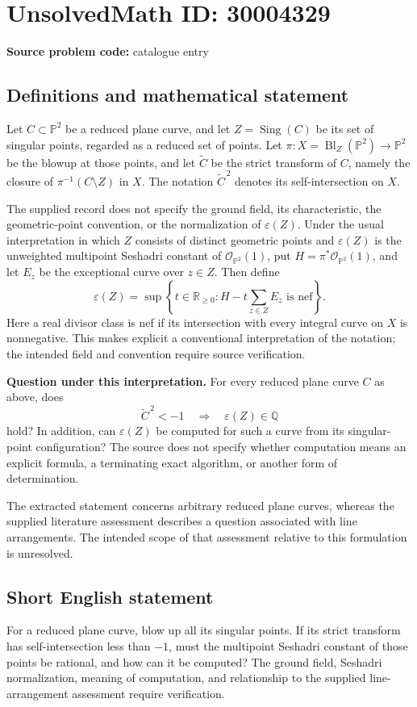 \documentclass[11pt]{article}
\newcommand{\Q}{\mathbb{Q}}
\newcommand{\R}{\mathbb{R}}
\newcommand{\PP}{\mathbb{P}}
\begin{document}
\section*{UnsolvedMath ID: 30004329}
\textbf{Source problem code:} catalogue entry
\subsection{Definitions and mathematical statement}
Let \(C\subset\PP^2\) be a reduced plane curve, and let \(Z=\operatorname{Sing}(C)\) be its set of singular points, regarded as a reduced set of points. Let \(\pi:X=\operatorname{Bl}_Z(\PP^2)\to\PP^2\) be the blowup at those points, and let \(\widetilde C\) be the strict transform of \(C\), namely the closure of \(\pi^{-1}(C\setminus Z)\) in \(X\). The notation \(\widetilde C^{\,2}\) denotes its self-intersection on \(X\).

The supplied record does not specify the ground field, its characteristic, the geometric-point convention, or the normalization of \(\varepsilon(Z)\). Under the usual interpretation in which \(Z\) consists of distinct geometric points and \(\varepsilon(Z)\) is the unweighted multipoint Seshadri constant of \(\mathcal O_{\PP^2}(1)\), put \(H=\pi^*\mathcal O_{\PP^2}(1)\), and let \(E_z\) be the exceptional curve over \(z\in Z\). Then define
\[
\varepsilon(Z)=\sup\left\{t\in\R_{\geq0}:H-t\sum_{z\in Z}E_z\text{ is nef}\right\}.
\]
Here a real divisor class is nef if its intersection with every integral curve on \(X\) is nonnegative. This makes explicit a conventional interpretation of the notation; the intended field and convention require source verification.

\textbf{Question under this interpretation.} For every reduced plane curve \(C\) as above, does
\[
\widetilde C^{\,2}<-1
\quad\Longrightarrow\quad
\varepsilon(Z)\in\Q
\]
hold? In addition, can \(\varepsilon(Z)\) be computed for such a curve from its singular-point configuration? The source does not specify whether computation means an explicit formula, a terminating exact algorithm, or another form of determination.

The extracted statement concerns arbitrary reduced plane curves, whereas the supplied literature assessment describes a question associated with line arrangements. The intended scope of that assessment relative to this formulation is unresolved.
\subsection{Short English statement}
For a reduced plane curve, blow up all its singular points. If its strict transform has self-intersection less than \(-1\), must the multipoint Seshadri constant of those points be rational, and how can it be computed? The ground field, Seshadri normalization, meaning of computation, and relationship to the supplied line-arrangement assessment require verification.
\end{document}
